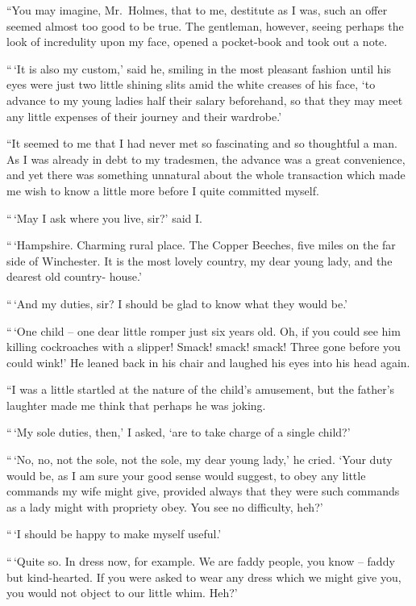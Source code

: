 “You may imagine, Mr.~Holmes, that to me, destitute as I
was, such an offer seemed almost too good to be true. The
gentleman, however, seeing perhaps the look of incredulity
upon my face, opened a pocket-book and took out a note.

“\,‘It is also my custom,’ said he, smiling in the most pleasant
fashion until his eyes were just two little shining slits
amid the white creases of his face, ‘to advance to my young
ladies half their salary beforehand, so that they may meet any
little expenses of their journey and their wardrobe.’

“It seemed to me that I had never met so fascinating and
so thoughtful a man. As I was already in debt to my tradesmen,
the advance was a great convenience, and yet there was
something unnatural about the whole transaction which made
me wish to know a little more before I quite committed myself.

“\,‘May I ask where you live, sir?’ said I.

“\,‘Hampshire. Charming rural place. The Copper Beech\-es,
five miles on the far side of Winchester. It is the most lovely
country, my dear young lady, and the dearest old country-%
house.’

“\,‘And my duties, sir? I should be glad to know what they
would be.’

“\,‘One child -- one dear little romper just six years old.
Oh, if you could see him killing cockroaches with a slipper!
Smack! smack! smack! Three gone before you could wink!’
He leaned back in his chair and laughed his eyes into his
head again.

“I was a little startled at the nature of the child’s amusement,
but the father’s laughter made me think that perhaps he
was joking.

“\,‘My sole duties, then,’ I asked, ‘are to take charge of a
single child?’

“\,‘No, no, not the sole, not the sole, my dear young lady,’
he cried. ‘Your duty would be, as I am sure your good sense
would suggest, to obey any little commands my wife might
give, provided always that they were such commands as a lady
might with propriety obey. You see no difficulty, heh?’

“\,‘I should be happy to make myself useful.’

“\,‘Quite so. In dress now, for example. We are faddy
people, you know -- faddy but kind-hearted. If you were asked
to wear any dress which we might give you, you would not
object to our little whim. Heh?’

